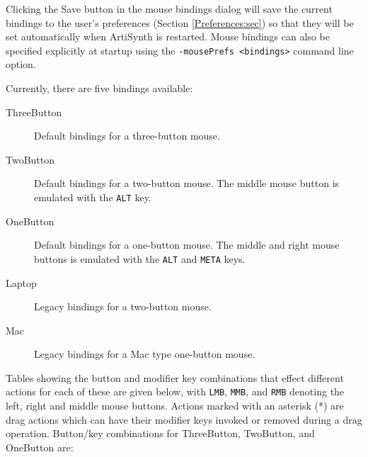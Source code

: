 \documentclass{article}
\begin{document}
Clicking the {\sf Save} button in the mouse bindings dialog will save
the current bindings  to the user's preferences (Section
\ref{Preferences:sec}) so that they will be set automatically when
ArtiSynth is restarted. Mouse bindings can also be specified
explicitly at startup using the {\tt -mousePrefs <bindings>} command
line option.

Currently, there are five bindings available:

\begin{description}

\item[ThreeButton]\mbox{}

Default bindings for a three-button mouse.

\item[TwoButton]\mbox{}

Default bindings for a two-button mouse. The middle mouse button
is emulated with the {\tt ALT} key.

\item[OneButton]\mbox{}

Default bindings for a one-button mouse. The middle and right mouse
buttons is emulated with the {\tt ALT} and {\tt META} keys.

\item[Laptop]\mbox{}

Legacy bindings for a two-button mouse.

\item[Mac]\mbox{}

Legacy bindings for a Mac type one-button mouse.

\end{description}

Tables showing the button and modifier key combinations that effect
different actions for each of these are given below, with {\tt LMB},
{\tt MMB}, and {\tt RMB} denoting the left, right and middle mouse
buttons.  Actions marked with an asterisk (*) are drag actions which
can have their modifier keys invoked or removed during a drag
operation. Button/key combinations for {\sf ThreeButton}, {\sf
TwoButton}, and {\sf OneButton} are:
\end{document}
